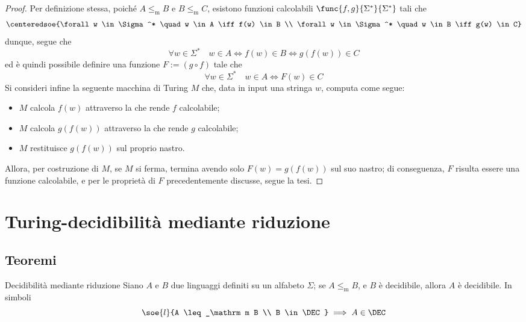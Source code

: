\documentclass[a4paper, 12pt]{report}
\begin{document}
    \begin{proof}
        Per definizione stessa, poiché $A \leq_\mathrm m B$ e $B \leq_\mathrm m C$, esistono funzioni calcolabili $\func{f, g}{\Sigma^*}{\Sigma^*}$ tali che $$\centeredsoe{\forall w \in \Sigma ^* \quad w \in A \iff f(w) \in B \\ \forall w \in \Sigma^* \quad w \in B \iff g(w) \in C}$$ dunque, segue che $$\forall w \in \Sigma^* \quad w \in A \iff f(w) \in B \iff g(f(w)) \in C$$ ed è quindi possibile definire una funzione $F := (g \circ f)$ tale che $$\forall w \in \Sigma^* \quad w \in A \iff F(w) \in C$$ Si consideri infine la seguente macchina di Turing $M$ che, data in input una stringa $w$, computa come segue:

        \begin{itemize}
            \item $M$ calcola $f(w)$ attraverso la \TM che rende $f$ calcolabile;
            \item $M$ calcola $g(f(w))$ attraverso la \TM che rende $g$ calcolabile;
            \item $M$ restituisce $g(f(w))$ sul proprio nastro.
        \end{itemize}

        Allora, per costruzione di $M$, se $M$ si ferma, termina avendo solo $F(w) = g(f(w))$ sul suo nastro; di conseguenza, $F$ risulta essere una funzione calcolabile, e per le proprietà di $F$ precedentemente discusse, segue la tesi.
    \end{proof}

    \section{Turing-decidibilità mediante riduzione}

    \subsection{Teoremi}

    \begin{framedthm}[label={dec w red}]{Decidibilità mediante riduzione}
        Siano $A$ e $B$ due linguaggi definiti su un alfabeto $\Sigma$; se $A \leq_\mathrm m B$, e $B$ è decidibile, allora $A$ è decidibile. In simboli $$\soe{l}{A \leq_\mathrm m B \\ B \in \DEC} \implies A \in \DEC$$
    \end{framedthm}
\end{document}
